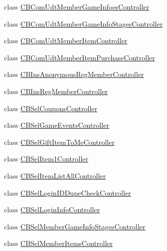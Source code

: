 \begin{DoxyCompactItemize}
\item 
class \hyperlink{class_cloud_bread_1_1_controllers_1_1_c_b_com_udt_member_game_infoes_controller}{C\+B\+Com\+Udt\+Member\+Game\+Infoes\+Controller}
\item 
class \hyperlink{class_cloud_bread_1_1_controllers_1_1_c_b_com_udt_member_game_info_stages_controller}{C\+B\+Com\+Udt\+Member\+Game\+Info\+Stages\+Controller}
\item 
class \hyperlink{class_cloud_bread_1_1_controllers_1_1_c_b_com_udt_member_item_controller}{C\+B\+Com\+Udt\+Member\+Item\+Controller}
\item 
class \hyperlink{class_cloud_bread_1_1_controllers_1_1_c_b_com_udt_member_item_purchase_controller}{C\+B\+Com\+Udt\+Member\+Item\+Purchase\+Controller}
\item 
class \hyperlink{class_cloud_bread_1_1_controllers_1_1_c_b_ins_anonymous_reg_member_controller}{C\+B\+Ins\+Anonymous\+Reg\+Member\+Controller}
\item 
class \hyperlink{class_cloud_bread_1_1_controllers_1_1_c_b_ins_reg_member_controller}{C\+B\+Ins\+Reg\+Member\+Controller}
\item 
class \hyperlink{class_cloud_bread_1_1_controllers_1_1_c_b_sel_coupons_controller}{C\+B\+Sel\+Coupons\+Controller}
\item 
class \hyperlink{class_cloud_bread_1_1_controllers_1_1_c_b_sel_game_events_controller}{C\+B\+Sel\+Game\+Events\+Controller}
\item 
class \hyperlink{class_cloud_bread_1_1_controllers_1_1_c_b_sel_gift_item_to_me_controller}{C\+B\+Sel\+Gift\+Item\+To\+Me\+Controller}
\item 
class \hyperlink{class_cloud_bread_1_1_controllers_1_1_c_b_sel_item1_controller}{C\+B\+Sel\+Item1\+Controller}
\item 
class \hyperlink{class_cloud_bread_1_1_controllers_1_1_c_b_sel_item_list_all_controller}{C\+B\+Sel\+Item\+List\+All\+Controller}
\item 
class \hyperlink{class_cloud_bread_1_1_controllers_1_1_c_b_sel_login_i_d_dupe_check_controller}{C\+B\+Sel\+Login\+I\+D\+Dupe\+Check\+Controller}
\item 
class \hyperlink{class_cloud_bread_1_1_controllers_1_1_c_b_sel_login_info_controller}{C\+B\+Sel\+Login\+Info\+Controller}
\item 
class \hyperlink{class_cloud_bread_1_1_controllers_1_1_c_b_sel_member_game_info_stages_controller}{C\+B\+Sel\+Member\+Game\+Info\+Stages\+Controller}
\item 
class \hyperlink{class_cloud_bread_1_1_controllers_1_1_c_b_sel_member_items_controller}{C\+B\+Sel\+Member\+Items\+Controller}

\end{DoxyCompactItemize}
